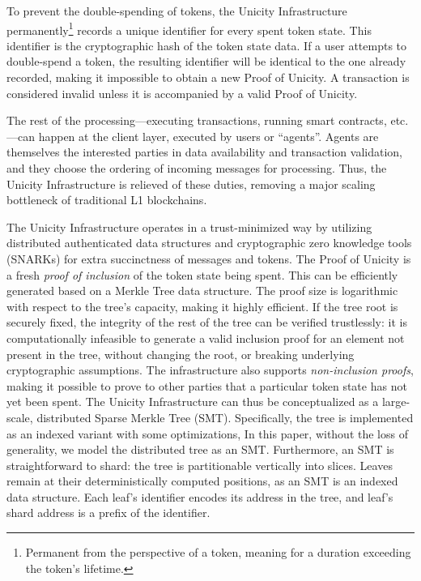 \documentclass[twocolumn]{article}
\begin{document}
To prevent the double-spending of tokens, the Unicity Infrastructure permanently\footnote{Permanent from the perspective of a token, meaning for a duration exceeding the token's lifetime.} records a unique identifier for every spent token state. This identifier is the cryptographic hash of the token state data. If a user attempts to double-spend a token, the resulting identifier will be identical to the one already recorded, making it impossible to obtain a new Proof of Unicity. A transaction is considered invalid unless it is accompanied by a valid Proof of Unicity.

The rest of the processing---executing transactions, running smart contracts, etc.---can happen at the client layer, executed by users or ``agents''. Agents are themselves the interested parties in data availability and transaction validation, and they choose the ordering of incoming messages for processing. Thus, the Unicity Infrastructure is relieved of these duties, removing a major scaling bottleneck of traditional L1 blockchains.

The Unicity Infrastructure operates in a trust-minimized way by utilizing distributed authenticated data structures and cryptographic zero knowledge tools (SNARKs) for extra succinctness of messages and tokens. The Proof of Unicity is a fresh \emph{proof of inclusion} of the token state being spent. This can be efficiently generated based on a Merkle Tree data structure. The proof size is logarithmic with respect to the tree's capacity, making it highly efficient. If the tree root is securely fixed, the integrity of the rest of the tree can be verified trustlessly: it is computationally infeasible to generate a valid inclusion proof for an element not present in the tree, without changing the root, or breaking underlying cryptographic assumptions. The infrastructure also supports \textit{non-inclusion proofs}, making it possible to prove to other parties that a particular token state has not yet been spent. The Unicity Infrastructure can thus be conceptualized as a large-scale, distributed Sparse Merkle Tree (SMT). Specifically, the tree is implemented as an indexed variant with some optimizations, In this paper, without the loss of generality, we model the distributed tree as an SMT. Furthermore, an SMT is straightforward to shard: the tree is partitionable vertically into slices. Leaves remain at their deterministically computed positions, as an SMT is an indexed data structure. Each leaf's identifier encodes its address in the tree, and leaf's shard address is a prefix of the identifier.
\end{document}
